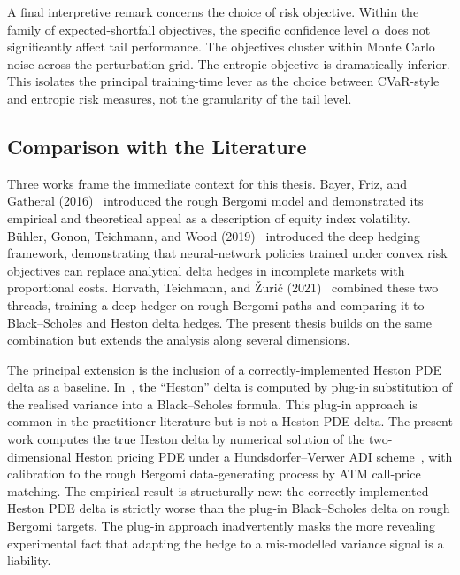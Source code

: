 \documentclass[12pt,a4paper]{article}
\theoremstyle{definition}
\theoremstyle{plain}
\theoremstyle{remark}
\theoremstyle{plain}
\begin{document}
A final interpretive remark concerns the choice of risk objective.
Within the family of expected-shortfall objectives, the specific
confidence level $\alpha$ does not significantly affect tail
performance. The objectives cluster within Monte Carlo noise across
the perturbation grid. The entropic objective is dramatically
inferior. This isolates the principal training-time lever as the
choice between CVaR-style and entropic risk measures, not the
granularity of the tail level.

\subsection{Comparison with the Literature}
\label{sec:7_2_literature}

Three works frame the immediate context for this thesis.
Bayer, Friz, and Gatheral (2016)~\cite{BayerFriz2016} introduced the
rough Bergomi model and demonstrated its empirical and theoretical
appeal as a description of equity index volatility.
B\"uhler, Gonon, Teichmann, and Wood (2019)~\cite{Buehler2019DeepHedging}
introduced the deep hedging framework, demonstrating that
neural-network policies trained under convex risk objectives can
replace analytical delta hedges in incomplete markets with
proportional costs.
Horvath, Teichmann, and \v{Z}uri\v{c} (2021)~\cite{Horvath2021DeepRough}
combined these two threads, training a deep hedger on rough Bergomi
paths and comparing it to Black--Scholes and Heston delta hedges. The
present thesis builds on the same combination but extends the
analysis along several dimensions.

The principal extension is the inclusion of a correctly-implemented
Heston PDE delta as a baseline. In~\cite{Horvath2021DeepRough}, the
``Heston'' delta is computed by plug-in substitution of the realised
variance into a Black--Scholes formula. This plug-in approach is
common in the practitioner literature but is not a Heston PDE delta.
The present work computes the true Heston delta by numerical
solution of the two-dimensional Heston pricing PDE under a
Hundsdorfer--Verwer ADI scheme~\cite{HundsdorferVerwer2003}, with
calibration to the rough Bergomi data-generating process by ATM
call-price matching. The empirical result is structurally new: the
correctly-implemented Heston PDE delta is strictly worse than the
plug-in Black--Scholes delta on rough Bergomi targets. The plug-in
approach inadvertently masks the more revealing experimental fact
that adapting the hedge to a mis-modelled variance signal is a
liability.
\end{document}
